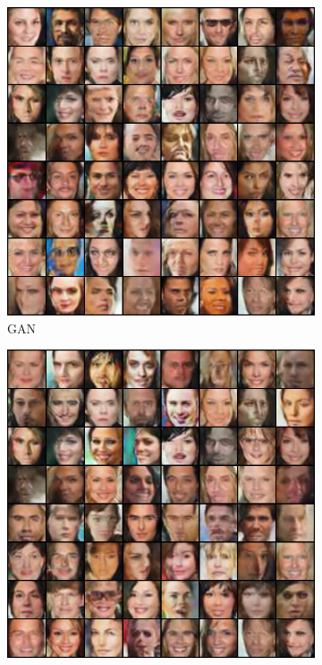 \begin{figure}[htbp]
    \centering
    \begin{subfigure}[b]{0.49\textwidth}
       \centering
       \includegraphics[width=\exfactor\textwidth]{figures/celeba/31_base_raw_base.png}
       \caption{GAN}
    \end{subfigure}
    \begin{subfigure}[b]{0.49\textwidth}
       \centering
       \includegraphics[width=\exfactor\textwidth]{figures/celeba/31_base_raw_reject.png}

\end{subfigure}
\end{figure}
